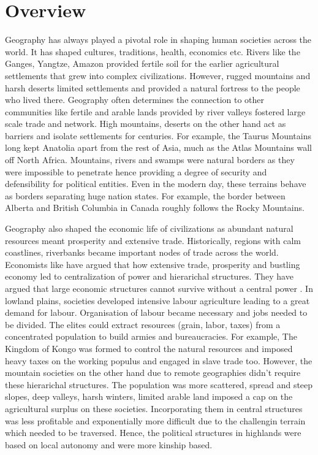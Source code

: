 \section{Overview}
Geography has always played a pivotal role in shaping human societies across the world. It has shaped cultures, traditions, health, economics etc. Rivers like the Ganges, Yangtze, Amazon provided fertile soil for the earlier agricultural settlements that grew into complex civilizations. However, rugged mountains and harsh deserts limited settlements and provided a natural fortress to the people who lived there. Geography often determines the connection to other communities like fertile and arable lands provided by river valleys fostered large scale trade and network. High mountains, deserts on the other hand act as barriers and isolate settlements for centuries. For example, the Taurus Mountains long kept Anatolia apart from the rest of Asia, much as the Atlas Mountains wall off North Africa. Mountains, rivers and swamps were natural borders as they were impossible to penetrate hence providing a degree of security and defensibility for political entities. Even in the modern day, these terrains behave as borders separating huge nation states. For example, the border between Alberta and British Columbia in Canada roughly follows the Rocky Mountains. 

\vspace{0.3cm}

Geography also shaped the economic life of civilizations as abundant natural resources meant prosperity and extensive trade. Historically, regions with calm coastlines, riverbanks became important nodes of trade across the world. Economists like \cite{smith1937wealth} have argued that how extensive trade, prosperity and bustling economy led to centralization of power and hierarichal structures. They have argued that large economic structures cannot survive without a central power \citep{robinson2012nations}. In lowland plains, societies developed intensive labour agriculture leading to a great demand for labour. Organisation of labour became necessary and jobs needed to be divided. The elites could extract resources (grain, labor, taxes) from a concentrated population to build armies and bureaucracies. For example, The Kingdom of Kongo was formed to control the natural resources and imposed heavy taxes on the working populus and engaged in slave trade too. However, the mountain societies on the other hand due to remote geographies didn't require these hierarichal structures. The population was more scattered, spread and  steep slopes, deep valleys, harsh winters, limited arable land imposed a cap on the agricultural surplus on these societies. Incorporating them in central structures was less profitable and exponentially more difficult due to the challengin terrain which needed to be traversed. Hence, the political structures in highlands were based on local autonomy and were more kinship based.

